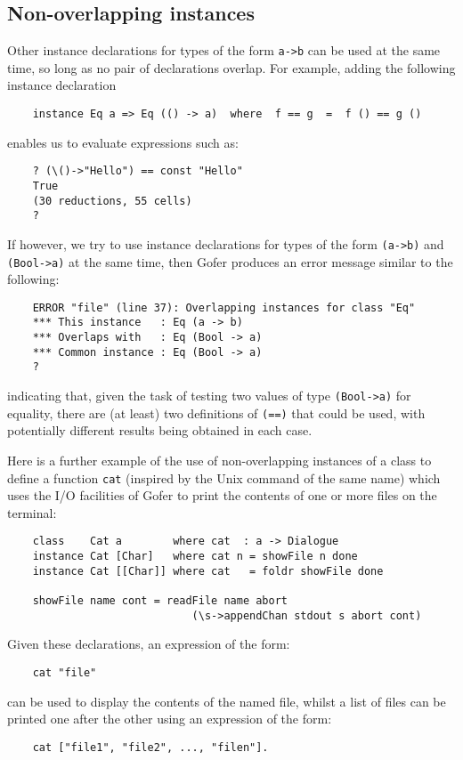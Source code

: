 \subsection{Non-overlapping instances}
Other instance declarations for types of the form \verb"a->b" can be used at
the same time, so  long  as  no  pair  of  declarations  overlap.   For
example, adding the following instance declaration
\begin{verbatim}
    instance Eq a => Eq (() -> a)  where  f == g  =  f () == g ()
\end{verbatim}
enables us to evaluate expressions such as:
\begin{verbatim}
    ? (\()->"Hello") == const "Hello"
    True
    (30 reductions, 55 cells)
    ? 
\end{verbatim}
If however, we try to use instance declarations for types of the  form
\verb"(a->b)" and \verb"(Bool->a)" 
at the same time, then Gofer produces an error
message similar to the following:
\begin{verbatim}
    ERROR "file" (line 37): Overlapping instances for class "Eq"
    *** This instance   : Eq (a -> b)
    *** Overlaps with   : Eq (Bool -> a)
    *** Common instance : Eq (Bool -> a)
    ? 
\end{verbatim}
indicating that, given the task of testing two values of type \verb"(Bool->a)"
for equality, there are (at least) two definitions of \verb"(==)"  that  could
be used, with potentially different  results  being  obtained  in  each
case.

Here is a further example of the use of non-overlapping instances of  a
class to define a function \verb"cat" (inspired by the Unix  command  of
the same name) which uses the I/O facilities  of  Gofer  to  print  the
contents of one or more files on the terminal:
\begin{verbatim}
    class    Cat a        where cat  : a -> Dialogue
    instance Cat [Char]   where cat n = showFile n done
    instance Cat [[Char]] where cat   = foldr showFile done

    showFile name cont = readFile name abort
                             (\s->appendChan stdout s abort cont)
\end{verbatim} 
Given these declarations, an expression of the form:
\begin{verbatim}
    cat "file"
\end{verbatim}
can be used to display the contents of the named file, whilst a list of
files can be printed one after the other using  an  expression  of  the
form:
\begin{verbatim}
    cat ["file1", "file2", ..., "filen"].
\end{verbatim}

